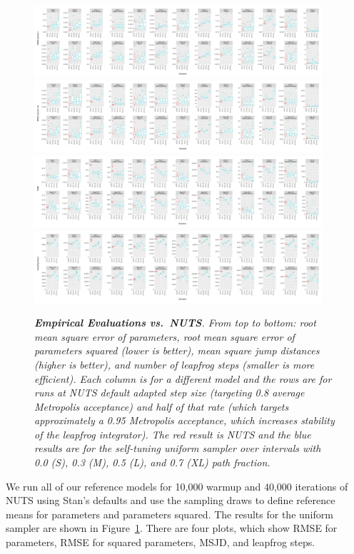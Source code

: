 \documentclass[letterpaper,11pt]{article}
\theoremstyle{plain}%
\theoremstyle{remark}
\begin{document}
\begin{figure}[th]
    \centering
    \includegraphics[width=0.95\textwidth]{img/results/uniform/vs_nuts_RMSE_param.pdf}
    \includegraphics[width=0.95\textwidth]{img/results/uniform/vs_nuts_RMSE_param_sq.pdf}
    \includegraphics[width=0.95\textwidth]{img/results/uniform/vs_nuts_MSJD.pdf}
    \includegraphics[width=0.95\textwidth]{img/results/uniform/vs_nuts_Leapfrog_Steps.pdf}
    \caption{\it {\bfseries Empirical Evaluations vs.~NUTS}. From top to bottom: root mean square error of parameters, root mean square error of parameters squared (lower is better), mean square jump distances (higher is better), and number of leapfrog steps (smaller is more efficient).  Each column is for a different model and the rows are for runs at NUTS default adapted step size (targeting 0.8 average Metropolis acceptance) and half of that rate (which targets approximately a 0.95 Metropolis acceptance, which increases stability of the leapfrog integrator).  The red result is NUTS and the blue results are for the self-tuning uniform sampler over intervals with 0.0 (S), 0.3 (M), 0.5 (L), and 0.7 (XL) path fraction.}
    \label{fig:empirical-evals}
\end{figure}
%
We run all of our reference models for 10,000 warmup and 40,000 iterations of NUTS using Stan's defaults and use the sampling draws to define reference means for parameters and parameters squared.  The results for the uniform sampler are shown in Figure~\ref{fig:empirical-evals}.  There are four plots, which show RMSE for parameters, RMSE for squared parameters, MSJD, and leapfrog steps.  
\end{document}
